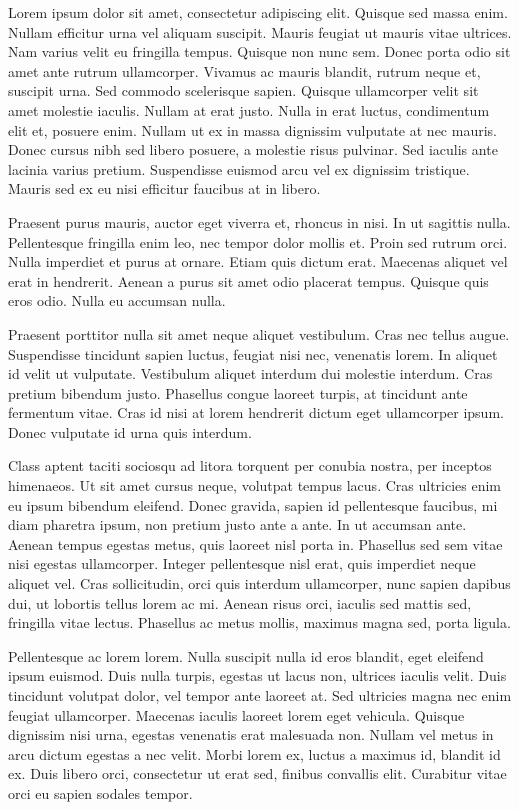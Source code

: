 Lorem ipsum dolor sit amet, consectetur adipiscing elit. Quisque sed massa enim. Nullam efficitur urna vel aliquam suscipit. Mauris feugiat ut mauris vitae ultrices. Nam varius velit eu fringilla tempus. Quisque non nunc sem. Donec porta odio sit amet ante rutrum ullamcorper. Vivamus ac mauris blandit, rutrum neque et, suscipit urna. Sed commodo scelerisque sapien. Quisque ullamcorper velit sit amet molestie iaculis. Nullam at erat justo. Nulla in erat luctus, condimentum elit et, posuere enim. Nullam ut ex in massa dignissim vulputate at nec mauris. Donec cursus nibh sed libero posuere, a molestie risus pulvinar. Sed iaculis ante lacinia varius pretium. Suspendisse euismod arcu vel ex dignissim tristique. Mauris sed ex eu nisi efficitur faucibus at in libero.

Praesent purus mauris, auctor eget viverra et, rhoncus in nisi. In ut sagittis nulla. Pellentesque fringilla enim leo, nec tempor dolor mollis et. Proin sed rutrum orci. Nulla imperdiet et purus at ornare. Etiam quis dictum erat. Maecenas aliquet vel erat in hendrerit. Aenean a purus sit amet odio placerat tempus. Quisque quis eros odio. Nulla eu accumsan nulla.

Praesent porttitor nulla sit amet neque aliquet vestibulum. Cras nec tellus augue. Suspendisse tincidunt sapien luctus, feugiat nisi nec, venenatis lorem. In aliquet id velit ut vulputate. Vestibulum aliquet interdum dui molestie interdum. Cras pretium bibendum justo. Phasellus congue laoreet turpis, at tincidunt ante fermentum vitae. Cras id nisi at lorem hendrerit dictum eget ullamcorper ipsum. Donec vulputate id urna quis interdum.

Class aptent taciti sociosqu ad litora torquent per conubia nostra, per inceptos himenaeos. Ut sit amet cursus neque, volutpat tempus lacus. Cras ultricies enim eu ipsum bibendum eleifend. Donec gravida, sapien id pellentesque faucibus, mi diam pharetra ipsum, non pretium justo ante a ante. In ut accumsan ante. Aenean tempus egestas metus, quis laoreet nisl porta in. Phasellus sed sem vitae nisi egestas ullamcorper. Integer pellentesque nisl erat, quis imperdiet neque aliquet vel. Cras sollicitudin, orci quis interdum ullamcorper, nunc sapien dapibus dui, ut lobortis tellus lorem ac mi. Aenean risus orci, iaculis sed mattis sed, fringilla vitae lectus. Phasellus ac metus mollis, maximus magna sed, porta ligula.

Pellentesque ac lorem lorem. Nulla suscipit nulla id eros blandit, eget eleifend ipsum euismod. Duis nulla turpis, egestas ut lacus non, ultrices iaculis velit. Duis tincidunt volutpat dolor, vel tempor ante laoreet at. Sed ultricies magna nec enim feugiat ullamcorper. Maecenas iaculis laoreet lorem eget vehicula. Quisque dignissim nisi urna, egestas venenatis erat malesuada non. Nullam vel metus in arcu dictum egestas a nec velit. Morbi lorem ex, luctus a maximus id, blandit id ex. Duis libero orci, consectetur ut erat sed, finibus convallis elit. Curabitur vitae orci eu sapien sodales tempor.

